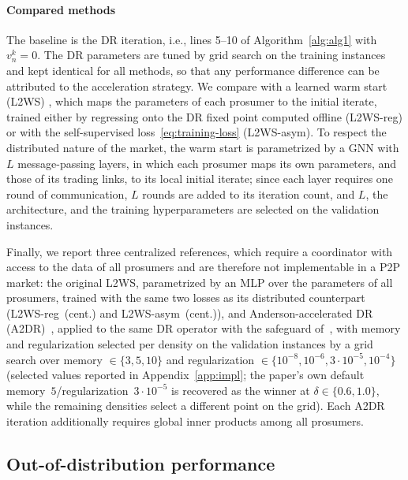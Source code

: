 \documentclass[final]{l4dc2026}
\begin{document}
\paragraph{Compared methods}
The baseline is the DR iteration, i.e., lines 5--10 of
Algorithm~\ref{alg:alg1} with $v^k_n = 0$. The DR parameters are tuned by
grid search on the training instances and kept identical for all methods,
so that any performance difference can be attributed to the acceleration
strategy. We compare with a learned warm start (L2WS)
\citep{sambharya2024learning}, which maps the parameters of each prosumer
to the initial iterate, trained either by regressing onto the DR fixed
point computed offline (L2WS-reg) or with the self-supervised
loss~\eqref{eq:training-loss} (L2WS-asym). To respect the distributed
nature of the market, the warm start is parametrized by a GNN with $L$
message-passing layers, in which each prosumer maps its own parameters, and those of its trading links, to its local initial iterate; since each layer requires one round of communication, $L$ rounds are added to its iteration count, and $L$, the architecture, and the training hyperparameters are selected on the validation instances.

Finally, we report three centralized references, which require a
coordinator with access to the data of all prosumers and are therefore not
implementable in a P2P market: the original L2WS, parametrized by an MLP
over the parameters of all prosumers, trained with the same two losses as its distributed counterpart (L2WS-reg~(cent.) and L2WS-asym~(cent.)), and Anderson-accelerated DR
(A2DR)~\citep{fu2020anderson}, applied to the same DR operator with the
safeguard of~\citet{fu2020anderson}, with memory and regularization
selected per density on the validation instances by a grid search over
memory $\in\{3,5,10\}$ and regularization $\in\{10^{-8},10^{-6},3\cdot10^{-5},10^{-4}\}$
(selected values reported in Appendix~\ref{app:impl}; the paper's own default
memory~$5$/regularization~$3\cdot10^{-5}$ is recovered as the winner at
$\delta\in\{0.6,1.0\}$, while the remaining densities select a different
point on the grid). Each A2DR iteration
additionally requires global inner products among all prosumers.

\subsection{Out-of-distribution performance}
\end{document}
